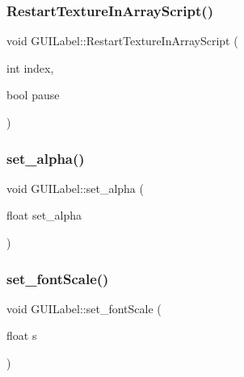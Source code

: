\hypertarget{class_g_u_i_label_ad2ca36af54cf6f1d2a83cdcfff4b4ea2}{}\label{class_g_u_i_label_ad2ca36af54cf6f1d2a83cdcfff4b4ea2} 
\subsubsection{\texorpdfstring{Restart\+Texture\+In\+Array\+Script()}{RestartTextureInArrayScript()}}
{\footnotesize\ttfamily void G\+U\+I\+Label\+::\+Restart\+Texture\+In\+Array\+Script (\begin{DoxyParamCaption}\item[{int}]{index,  }\item[{bool}]{pause }\end{DoxyParamCaption})}

\hypertarget{class_g_u_i_label_a995d9405500c145f733ac4b35166e99e}{}\label{class_g_u_i_label_a995d9405500c145f733ac4b35166e99e} 
\subsubsection{\texorpdfstring{set\+\_\+alpha()}{set\_alpha()}}
{\footnotesize\ttfamily void G\+U\+I\+Label\+::set\+\_\+alpha (\begin{DoxyParamCaption}\item[{float}]{set\+\_\+alpha }\end{DoxyParamCaption})}

\hypertarget{class_g_u_i_label_a40ac30107b25bcc4976b3e4ee6e1bd34}{}\label{class_g_u_i_label_a40ac30107b25bcc4976b3e4ee6e1bd34} 
\subsubsection{\texorpdfstring{set\+\_\+font\+Scale()}{set\_fontScale()}}
{\footnotesize\ttfamily void G\+U\+I\+Label\+::set\+\_\+font\+Scale (\begin{DoxyParamCaption}\item[{float}]{s }\end{DoxyParamCaption})}

